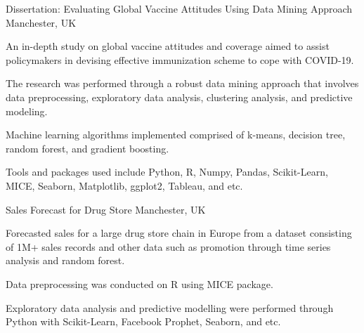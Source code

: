 

\begin{cvprojects}

  \cvproject
    {} %
    {Dissertation: Evaluating Global Vaccine Attitudes Using Data Mining Approach} %
    {Manchester, UK} %
    {} %
    {
      \begin{cvitems} %
        \item {An in-depth study on global vaccine attitudes and coverage aimed to assist policymakers in devising effective immunization scheme to cope with COVID-19.}
        \item {The research was performed through a robust data mining approach that involves data preprocessing, exploratory data analysis, clustering analysis, and predictive modeling.}
        \item {Machine learning algorithms implemented comprised of k-means, decision tree, random forest, and gradient boosting.}
        \item {Tools and packages used include Python, R, Numpy, Pandas, Scikit-Learn, MICE, Seaborn, Matplotlib, ggplot2, Tableau, and etc.}
      \end{cvitems}
    }

  \cvproject
    {} %
    {Sales Forecast for Drug Store} %
    {Manchester, UK} %
    {} %
    {
      \begin{cvitems} %
        \item {Forecasted sales for a large drug store chain in Europe from a dataset consisting of 1M+ sales records and other data such as promotion through time series analysis and random forest.}
        \item {Data preprocessing was conducted on R using MICE package.}
        \item  {Exploratory data analysis and predictive modelling were performed through Python with Scikit-Learn, Facebook Prophet, Seaborn, and etc.}
      \end{cvitems}
    }


\end{cvprojects}
